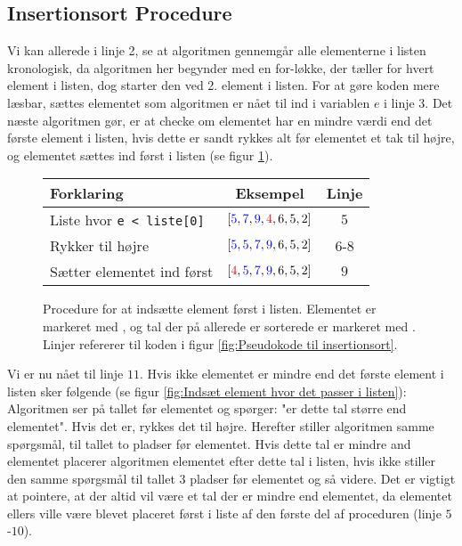 \subsection{Insertionsort Procedure}%
\label{sub:Insertionsort Procedure}

Vi kan allerede i linje 2, se at algoritmen gennemgår alle elementerne i listen kronologisk, da algoritmen her begynder med en for-løkke, der tæller for hvert element i listen, dog starter den ved 2. element i listen. For at gøre koden mere læsbar, sættes elementet som algoritmen er nået til ind i variablen $e$ i linje 3. Det næste algoritmen gør, er at checke om elementet har en mindre værdi end det første element i listen, hvis dette er sandt rykkes alt før elementet et tak til højre, og elementet sættes ind først i listen (se figur \ref{fig:Indsæt element først i listen}).

\begin{figure}[h]
	\begin{center}
		\padtable
		\begin{tabular}{l|c|c}
			Forklaring & Eksempel & Linje \\
			\hline
			Liste hvor \verb|e < liste[0]| & $[\color{blue}5\color{black},\color{blue}7\color{black},\color{blue}9\color{black},\color{red}4\color{black},6,5,2]$ & $5$ \\
			Rykker til højre & $[\color{blue}5\color{black},\color{blue}5\color{black},\color{blue}7\color{black},\color{blue}9\color{black},6,5,2]$ & $6$-$8$\\
			Sætter elementet ind først  & $[\color{red}4\color{black},\color{blue}5\color{black},\color{blue}7\color{black},\color{blue}9\color{black},6,5,2]$ & $9$
		\end{tabular}
	\end{center}
	\vspace{-3mm}
	\caption{Procedure for at indsætte element først i listen. Elementet er markeret med , og tal der på allerede er sorterede er markeret med . Linjer refererer til koden i figur \ref{fig:Pseudokode til insertionsort}.}
	\label{fig:Indsæt element først i listen}
\end{figure}


Vi er nu nået til linje $11$. Hvis ikke elementet er mindre end det første element i listen sker følgende (se figur \ref{fig:Indsæt element hvor det passer i listen}): Algoritmen ser på tallet før elementet og spørger: "er dette tal større end elementet". Hvis det er, rykkes det til højre. Herefter stiller algoritmen samme spørgsmål, til tallet to pladser før elementet. Hvis dette tal er mindre and elementet placerer algoritmen elementet efter dette tal i listen, hvis ikke stiller den samme spørgsmål til tallet 3 pladser før elementet og så videre. Det er vigtigt at pointere, at der altid vil være et tal der er mindre end elementet, da elementet ellers ville være blevet placeret først i liste af den første del af proceduren (linje $5$-$10$).


